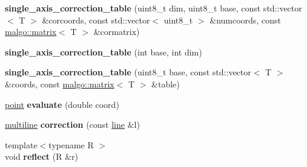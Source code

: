 \begin{DoxyCompactItemize}
\item 
{\bfseries single\+\_\+axis\+\_\+correction\+\_\+table} (uint8\+\_\+t dim, uint8\+\_\+t base, const std\+::vector$<$ T $>$ \&corcoords, const std\+::vector$<$ uint8\+\_\+t $>$ \&numcoords, const \hyperlink{classmalgo_1_1matrix}{malgo\+::matrix}$<$ T $>$ \&cormatrix)\hypertarget{classgxx_1_1ngeom_1_1single__axis__correction__table_a299b90ccb62010958c2a6b017470e0c5}{}\label{classgxx_1_1ngeom_1_1single__axis__correction__table_a299b90ccb62010958c2a6b017470e0c5}

\item 
{\bfseries single\+\_\+axis\+\_\+correction\+\_\+table} (int base, int dim)\hypertarget{classgxx_1_1ngeom_1_1single__axis__correction__table_ad856aa01247b02c288a7e3cf661442ba}{}\label{classgxx_1_1ngeom_1_1single__axis__correction__table_ad856aa01247b02c288a7e3cf661442ba}

\item 
{\bfseries single\+\_\+axis\+\_\+correction\+\_\+table} (uint8\+\_\+t base, const std\+::vector$<$ T $>$ \&coords, const \hyperlink{classmalgo_1_1matrix}{malgo\+::matrix}$<$ T $>$ \&table)\hypertarget{classgxx_1_1ngeom_1_1single__axis__correction__table_a74714b7d59fc72a38137c194375ce4ce}{}\label{classgxx_1_1ngeom_1_1single__axis__correction__table_a74714b7d59fc72a38137c194375ce4ce}

\item 
\hyperlink{classgxx_1_1ngeom_1_1point}{point} {\bfseries evaluate} (double coord)\hypertarget{classgxx_1_1ngeom_1_1single__axis__correction__table_aae270099341f58bdc0f05c1ce3ddb240}{}\label{classgxx_1_1ngeom_1_1single__axis__correction__table_aae270099341f58bdc0f05c1ce3ddb240}

\item 
\hyperlink{classgxx_1_1ngeom_1_1multiline}{multiline} {\bfseries correction} (const \hyperlink{classgxx_1_1ngeom_1_1line}{line} \&l)\hypertarget{classgxx_1_1ngeom_1_1single__axis__correction__table_a494982eaa3f458acd836ab1b59e7bd43}{}\label{classgxx_1_1ngeom_1_1single__axis__correction__table_a494982eaa3f458acd836ab1b59e7bd43}

\item 
{\footnotesize template$<$typename R $>$ }\\void {\bfseries reflect} (R \&r)\hypertarget{classgxx_1_1ngeom_1_1single__axis__correction__table_a1ba35ce1f4fd1e586bd1cbba430fe054}{}\label{classgxx_1_1ngeom_1_1single__axis__correction__table_a1ba35ce1f4fd1e586bd1cbba430fe054}

\end{DoxyCompactItemize}
